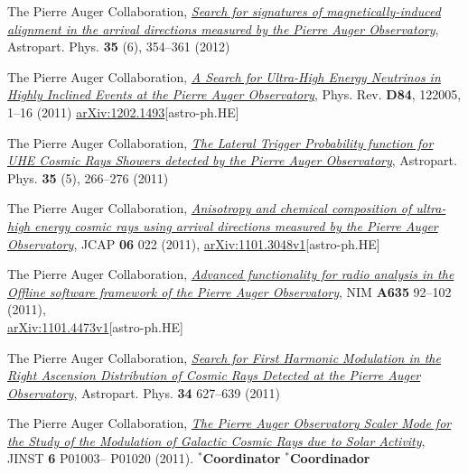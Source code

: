 \begin{etaremune}
\item {}The Pierre Auger Collaboration, 
\href{http://dx.doi.org/10.1016/j.astropartphys.2011.10.004}{\emph{Search for
signatures of magnetically-induced alignment in the arrival directions measured
by the Pierre Auger Observatory}}, Astropart. Phys. {\bf{35}} (6), 354--361
(2012)

\item {}The Pierre Auger Collaboration,
\href{http://dx.doi.org/10.1016/10.1103/PhysRevD.84.122005}{\emph{A Search for
Ultra-High Energy Neutrinos in Highly Inclined Events at the Pierre Auger
Observatory}}, Phys.  Rev. {\bf D84}, 122005, 1--16 (2011)
\href{http://arxiv.org/abs/1202.1493}{arXiv:1202.1493}[astro-ph.HE]

\item {}The Pierre Auger Collaboration, 
\href{http://dx.doi.org/10.1016/j.astropartphys.2011.08.001}{\emph{The Lateral
Trigger Probability function for UHE Cosmic Rays Showers detected by the Pierre
Auger Observatory}}, Astropart. Phys. {\bf{35}} (5), 266--276 (2011)

\item {}The Pierre Auger Collaboration,
\href{http://dx.doi.org/10.1088/1475-7516/2011/06/022}{\emph{Anisotropy and
chemical composition of ultra-high energy cosmic rays using arrival directions
measured by the Pierre Auger Observatory}}, JCAP {\bf 06} 022 (2011),
\href{http://arxiv.org/abs/1106.3048}{arXiv:1101.3048v1}[astro-ph.HE]

\item {}The Pierre Auger Collaboration,
\href{http://dx.doi.org/10.1016/j.nima.2011.01.049}{{\emph{Advanced
functionality for radio analysis in the Offline software framework of the
Pierre Auger Observatory}}}, NIM {\bf A635} 92--102
(2011),\\
\href{http://arxiv.org/abs/1101.4473}{arXiv:1101.4473v1}[astro-ph.HE]

\item {}The Pierre Auger Collaboration,
\href{http://dx.doi.org/10.1016/j.astropartphys.2010.12.007}{\emph{Search for
First Harmonic Modulation in the Right Ascension Distribution of Cosmic Rays
Detected at the Pierre Auger Observatory}}, Astropart. Phys. {\bf 34} 627--639
(2011)

\item {}The Pierre Auger Collaboration,
\href{http://dx.doi.org/10.1088/1748-0221/6/01/P01003}{\emph{The Pierre Auger
Observatory Scaler Mode for the Study of the Modulation of Galactic Cosmic Rays
due to Solar Activity}}, JINST {\bf 6} P01003--
P01020 (2011). \ifeng $^*${\bf{Coordinator}} \else $^*${\bf{Coordinador}} \fi


\end{etaremune}
